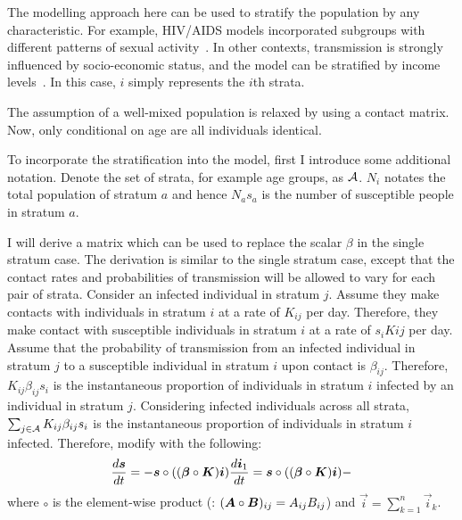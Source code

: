 \documentclass[thesis.tex]{subfiles}
\begin{document}
The modelling approach here can be used to stratify the population by any characteristic.
For example, HIV/AIDS models incorporated subgroups with different patterns of sexual activity~\autocite{kretzschmarMathematical}.
In other contexts, transmission is strongly influenced by socio-economic status, and the model can be stratified by income levels~\autocite{menkirIncorporating}.
In this case, $i$ simply represents the $i$th strata.

The assumption of a well-mixed population is relaxed by using a contact matrix.
Now, only conditional on age are all individuals identical.

To incorporate the stratification into the model, first I introduce some additional notation.
Denote the set of strata, for example age groups, as $\mathcal{A}$. $N_i$ notates the total population of stratum $a$ and hence $N_a s_a$ is the number of susceptible people in stratum $a$.

I will derive a matrix which can be used to replace the scalar $\beta$ in the single stratum case.
The derivation is similar to the single stratum case, except that the contact rates and probabilities of transmission will be allowed to vary for each pair of strata.
Consider an infected individual in stratum $j$.
Assume they make contacts with individuals in stratum $i$ at a rate of $K_{ij}$ per day.
Therefore, they make contact with susceptible individuals in stratum $i$ at a rate of $s_i K{ij}$ per day.
Assume that the probability of transmission from an infected individual in stratum $j$ to a susceptible individual in stratum $i$ upon contact is $\beta_{ij}$.
Therefore, $K_{ij} \beta_{ij} s_i$ is the instantaneous proportion of individuals in stratum $i$ infected by an individual in stratum $j$.
Considering infected individuals across all strata, $\sum_{j \in \mathcal{A}} K_{ij} \beta_{ij} s_i$ is the instantaneous proportion of individuals in stratum $i$ infected.
Therefore, modify with the following:
\begin{align}
    \frac{d\bm{s}}{dt} = -\bm{s} \circ ((\bm{\beta} \circ \bm{K}) \bm{i})
    \frac{d\bm{i}_1}{dt} = \bm{s} \circ ((\bm{\beta} \circ \bm{K}) \bm{i}) -
    \label{eq:matrix:theory}
\end{align}
where $\circ$ is the element-wise product (\ie: $(\bm{A} \circ \bm{B})_{ij} = A_{ij} B_{ij}$) and $\vec{i} = \sum_{k=1}^n \vec{i}_k$.
\end{document}
